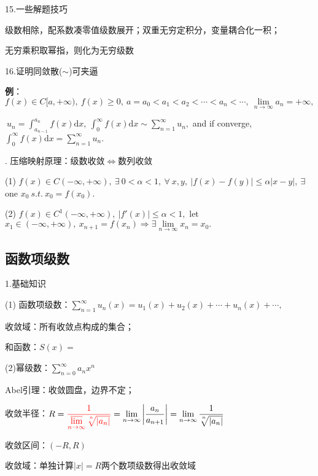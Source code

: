 \documentclass[UTF8]{ctexart}
\numberwithin{equation}{section}
\numberwithin{figure}{section}
\numberwithin{table}{section}
\newcommand\dif{\mathrm{d}}
\newcommand\no{\noindent}
\newcommand\dis{\displaystyle}
\newcommand\ls{\leqslant}
\newcommand\gs{\geqslant}
\newcommand\limn{\dis\lim\limits_{n\to\infty}}
\newcommand\sumn{\dis\sum\limits_{n=1}^{\infty}}
\newcommand\sumnz{\dis\sum\limits_{n=0}^{\infty}}
\newcommand\intd{\dis\int}
\begin{document}
\begin{spacing}{2}
\vspace{0.2cm}

\no15.一些解题技巧

级数相除，配系数凑零值级数展开；双重无穷定积分，变量耦合化一积；

无穷乘积取幂指，则化为无穷级数

\no16.证明同敛散($\sim$)可夹逼

\textbf{例}：$f(x)\in C[a,+\infty),\ f(x)\gs0,\ a=a_0<a_1<a_2<\cdots<a_n<\cdots,\ 
\limn a_n=+\infty,$

$\ u_n=\intd_{a_{n-1}}^{a_n}f(x)\dif x,\ \intd_0^\infty f(x)\dif x\sim\sumn u_n,$ 
and if converge, $\intd_0^\infty f(x)\dif x=\sumn u_n.$

\vspace{0.2cm}

\no17. \textcolor[rgb]{1,0,0}{压缩映射}原理：级数收敛$\Longleftrightarrow$数列收敛

(1) $f(x)\in C(-\infty,+\infty),\ \exists\ 0<\alpha<1,\ \forall\ x,y,\ |f(x)-f(y)|\ls\alpha|x-y|,\ 
\exists$ one $x_0\ s.t.\ x_0=f(x_0).$

(2) $f(x)\in C^1(-\infty,+\infty),\ |f'(x)|\ls\alpha<1,$ let $x_1\in(-\infty,+\infty),\ 
x_{n+1}=f(x_n)\Longrightarrow\exists\limn x_n=x_0.$

\subsection{函数项级数}

\no1.基础知识

\no(1) 函数项级数：$\sumn u_n(x)=u_1(x)+u_2(x)+\cdots+u_n(x)+\cdots,\ $

\vspace{0.2cm}

收敛域：所有收敛点构成的集合；

和函数：$S(x)=$

\no(2)幂级数：$\sumnz a_nx^n$

\vspace{0.2cm}

Abel引理：收敛圆盘，边界不定；

收敛半径：$R=\textcolor[rgb]{1,0,0}{\dis\dfrac{1}{\varlimsup\limits_{n\to\infty}\sqrt[^n\!]{|a_n|}}}
=\limn\left|\dfrac{a_n}{a_{n+1}}\right|
=\limn\dfrac{1}{\sqrt[^n\!]{|a_n|}}$

\vspace{0.2cm}

收敛区间：$(-R,R)$

收敛域：单独计算$|x|=R$两个数项级数得出收敛域


\end{spacing}
\end{document}
